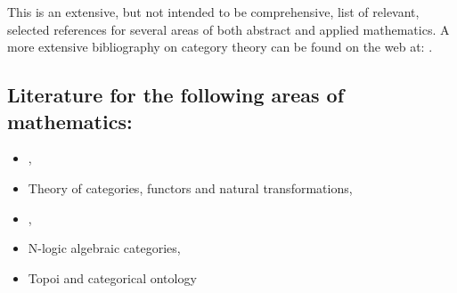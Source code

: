 \documentclass[12pt]{article}
\begin{document}
This is an extensive, but not intended to be comprehensive, list of relevant, selected references for several areas of both abstract and applied mathematics. A more extensive bibliography on category theory can be found on the 
web at: 
.

\subsection{Literature for the following areas of mathematics:}

\begin{itemize}
\item {}, 
\item Theory of categories, functors and natural transformations,
\item {}, 
\item N-logic algebraic categories,  
\item Topoi and categorical ontology
\end{itemize}
\end{document}
